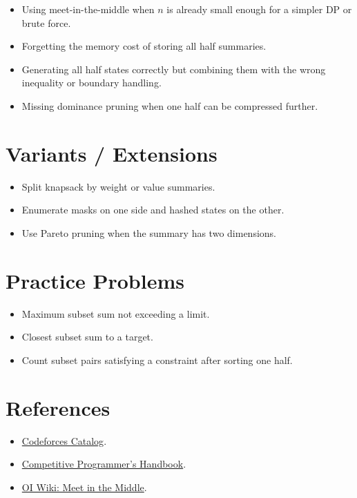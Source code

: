 \begin{itemize}
  \item Using meet-in-the-middle when \(n\) is already small enough for a simpler DP or brute force.
  \item Forgetting the memory cost of storing all half summaries.
  \item Generating all half states correctly but combining them with the wrong inequality or boundary handling.
  \item Missing dominance pruning when one half can be compressed further.
\end{itemize}

\section*{Variants / Extensions}

\begin{itemize}
  \item Split knapsack by weight or value summaries.
  \item Enumerate masks on one side and hashed states on the other.
  \item Use Pareto pruning when the summary has two dimensions.
\end{itemize}

\section*{Practice Problems}

\begin{itemize}
  \item Maximum subset sum not exceeding a limit.
  \item Closest subset sum to a target.
  \item Count subset pairs satisfying a constraint after sorting one half.
\end{itemize}

\section*{References}

\begin{itemize}
  \item \href{https://codeforces.com/catalog?locale=en}{Codeforces Catalog}.
  \item \href{https://usaco.guide/CPH.pdf}{Competitive Programmer's Handbook}.
  \item \href{https://oi-wiki.org/search/mitm/}{OI Wiki: Meet in the Middle}.
\end{itemize}
